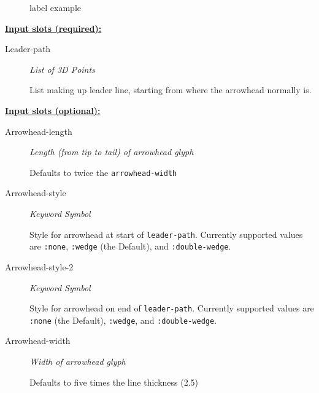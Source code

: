 \documentclass [11pt]{book}
\begin{document}
\begin{itemize}
\begin{figure}
\caption{label example}

\label{fig:label}

\end{figure}





\textbf{
\underline{Input slots (required):}}

\begin{description}

\item [Leader-path]
\emph{List of 3D Points}

 List making up leader line, starting from where the arrowhead normally is.




\end{description}






\textbf{
\underline{Input slots (optional):}}

\begin{description}

\item [Arrowhead-length]
\emph{Length (from tip to tail) of arrowhead glyph}

 Defaults to twice the \texttt{arrowhead-width}




\item [Arrowhead-style]
\emph{Keyword Symbol}

 Style for arrowhead at start of \texttt{leader-path}. Currently supported values
are \texttt{:none}, \texttt{:wedge}  (the Default), and \texttt{:double-wedge}.




\item [Arrowhead-style-2]
\emph{Keyword Symbol}

 Style for arrowhead on end of \texttt{leader-path}. Currently supported values
are \texttt{:none} (the Default), \texttt{:wedge}, and \texttt{:double-wedge}.




\item [Arrowhead-width]
\emph{Width of arrowhead glyph}

 Defaults to five times the line thickness (2.5)





\end{description}
\end{itemize}
\end{document}
